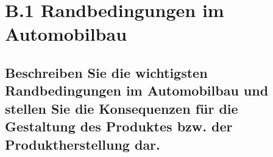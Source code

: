 \section*{B.1 Randbedingungen im Automobilbau}

\subsection{Beschreiben Sie die wichtigsten Randbedingungen im Automobilbau und stellen Sie die Konsequenzen f\"ur die Gestaltung des Produktes bzw. der Produktherstellung dar.}
